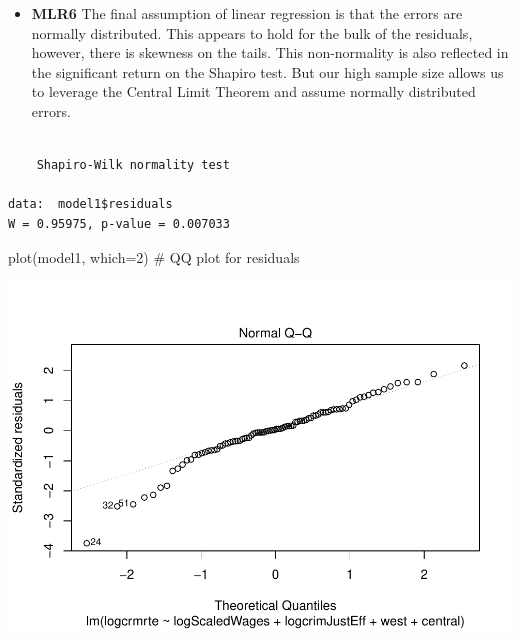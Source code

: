 \documentclass[]{article}
\newenvironment{Shaded}{}{}
\newcommand{\CommentTok}[1]{\textcolor[rgb]{0.00,0.50,0.00}{#1}}
\newcommand{\DataTypeTok}[1]{#1}
\newcommand{\DecValTok}[1]{#1}
\newcommand{\KeywordTok}[1]{\textcolor[rgb]{0.00,0.00,1.00}{#1}}
\newcommand{\NormalTok}[1]{#1}
\newcommand{\OperatorTok}[1]{#1}
\providecommand{\tightlist}{%
  \setlength{\itemsep}{0pt}\setlength{\parskip}{0pt}}
\begin{document}
\begin{itemize}
\tightlist
\item
  \textbf{MLR6} The final assumption of linear regression is that the
  errors are normally distributed. This appears to hold for the bulk of
  the residuals, however, there is skewness on the tails. This
  non-normality is also reflected in the significant return on the
  Shapiro test. But our high sample size allows us to leverage the
  Central Limit Theorem and assume normally distributed errors.
\end{itemize}

\begin{Shaded}
\end{Shaded}

\begin{verbatim}

    Shapiro-Wilk normality test

data:  model1$residuals
W = 0.95975, p-value = 0.007033
\end{verbatim}

\begin{Shaded}
\begin{Highlighting}[]
\KeywordTok{plot}\NormalTok{(model1, }\DataTypeTok{which=}\DecValTok{2}\NormalTok{) }\CommentTok{# QQ plot for residuals}
\end{Highlighting}
\end{Shaded}

\includegraphics{Bagnard_Gaustad_Hartman_Leung_Lab_3_files/figure-latex/unnamed-chunk-63-1.pdf}
\end{document}
